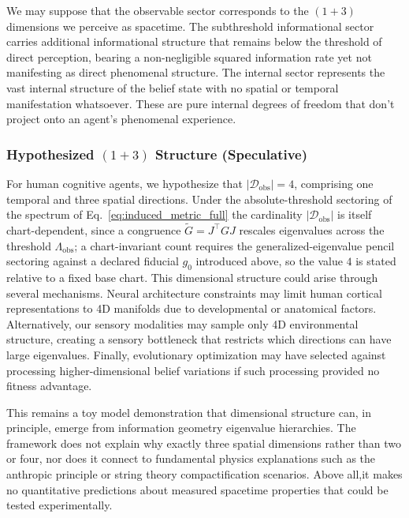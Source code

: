 \documentclass[11pt]{article}
\begin{document}
We may suppose that the observable sector corresponds to the $(1+3)$ dimensions we perceive as spacetime. The subthreshold informational sector carries additional informational structure that remains below the threshold of direct perception, bearing a non-negligible squared information rate yet not manifesting as direct phenomenal structure. The internal sector represents the vast internal structure of the belief state with no spatial or temporal manifestation whatsoever. These are pure internal degrees of freedom that don't project onto an agent's phenomenal experience.

\subsubsection{Hypothesized $(1+3)$ Structure (Speculative)}

For human cognitive agents, we hypothesize that $|\mathcal{D}_{\text{obs}}| = 4$, comprising one temporal and three spatial directions. Under the absolute-threshold sectoring of the spectrum of Eq.~\eqref{eq:induced_metric_full} the cardinality $|\mathcal{D}_{\text{obs}}|$ is itself chart-dependent, since a congruence $\tilde{G} = J^\top G J$ rescales eigenvalues across the threshold $\Lambda_{\text{obs}}$; a chart-invariant count requires the generalized-eigenvalue pencil sectoring against a declared fiducial $g_0$ introduced above, so the value $4$ is stated relative to a fixed base chart. This dimensional structure could arise through several mechanisms. Neural architecture constraints may limit human cortical representations to 4D manifolds due to developmental or anatomical factors. Alternatively, our sensory modalities may sample only 4D environmental structure, creating a sensory bottleneck that restricts which directions can have large eigenvalues. Finally, evolutionary optimization may have selected against processing higher-dimensional belief variations if such processing provided no fitness advantage.

This remains a toy model demonstration that dimensional structure can, in principle, emerge from information geometry eigenvalue hierarchies. The framework does not explain why exactly three spatial dimensions rather than two or four, nor does it connect to fundamental physics explanations such as the anthropic principle or string theory compactification scenarios. Above all,it makes no quantitative predictions about measured spacetime properties that could be tested experimentally.
\end{document}
